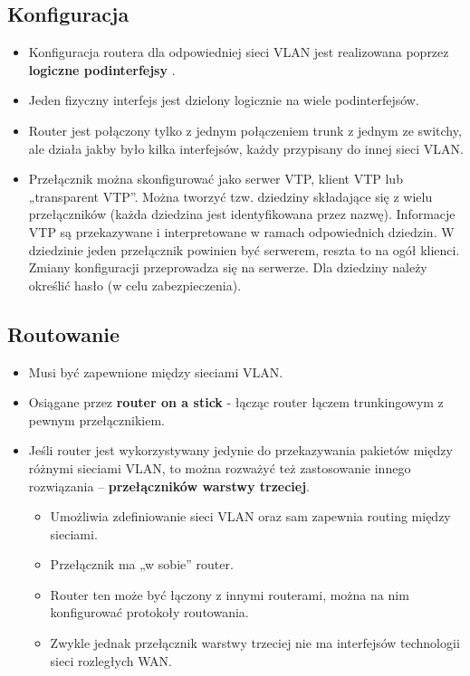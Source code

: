 \documentclass[../sk-egzamin.tex]{subfiles}
\begin{document}
\subsection*{Konfiguracja}
\begin{itemize}
    \item Konfiguracja routera dla odpowiedniej sieci VLAN jest realizowana
    poprzez \textbf{logiczne podinterfejsy }.

    \item Jeden fizyczny interfejs jest dzielony logicznie na wiele
    podinterfejsów.

    \item Router jest połączony tylko z jednym połączeniem trunk z jednym
    ze switchy, ale działa jakby było kilka interfejsów, każdy przypisany
    do innej sieci VLAN.

    \item Przełącznik można skonfigurować jako serwer VTP,
    klient VTP lub „transparent VTP”.
    Można tworzyć tzw. dziedziny składające się z wielu
    przełączników (każda dziedzina jest identyfikowana przez nazwę).
    Informacje VTP są przekazywane i interpretowane w ramach odpowiednich
    dziedzin.
    W dziedzinie jeden przełącznik powinien być serwerem, reszta to na ogół
    klienci.
    Zmiany konfiguracji przeprowadza się na serwerze.
    Dla dziedziny należy określić hasło (w celu zabezpieczenia).
\end{itemize}

\subsection*{Routowanie}

\begin{itemize}
    \item Musi być zapewnione między sieciami VLAN.
    \item Osiągane przez \textbf{router on a stick} -
    łącząc router łączem trunkingowym z pewnym przełącznikiem.
    \item Jeśli router jest wykorzystywany jedynie do przekazywania pakietów
    między różnymi sieciami VLAN, to można rozważyć też zastosowanie innego
    rozwiązania – \textbf{przełączników warstwy trzeciej}.
    \begin{itemize}
        \item  Umożliwia zdefiniowanie sieci VLAN oraz sam zapewnia routing
        między sieciami.
        \item Przełącznik ma „w sobie” router.
        \item Router ten może być łączony z innymi routerami, można na nim
        konfigurować protokoły routowania.
        \item Zwykle jednak przełącznik warstwy trzeciej nie ma interfejsów
        technologii sieci rozległych WAN.
    \end{itemize}
\end{itemize}

\pagebreak
\end{document}
